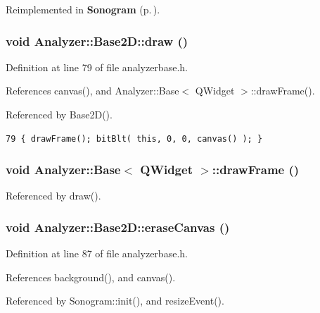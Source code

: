 Reimplemented in {\bf Sonogram} {\rm (p.\,\pageref{classSonogram_Sonograma5})}.
\subsubsection{\setlength{\rightskip}{0pt plus 5cm}void Analyzer::Base2D::draw ()\hspace{0.3cm}{\tt  [inline, private, slot]}}\label{classAnalyzer_1_1Base2D_Analyzer_1_1Base2Dk0}




Definition at line 79 of file analyzerbase.h.

References canvas(), and Analyzer::Base$<$ QWidget $>$::draw\-Frame().

Referenced by Base2D().



\footnotesize\begin{verbatim}79 { drawFrame(); bitBlt( this, 0, 0, canvas() ); }
\end{verbatim}\normalsize 
{}
\subsubsection{\setlength{\rightskip}{0pt plus 5cm}void {\bf Analyzer::Base}$<$ {\bf QWidget}  $>$::draw\-Frame ()\hspace{0.3cm}{\tt  [protected, inherited]}}\label{classAnalyzer_1_1Base_Analyzer_1_1Baseb1}




Referenced by draw().
\subsubsection{\setlength{\rightskip}{0pt plus 5cm}void Analyzer::Base2D::erase\-Canvas ()\hspace{0.3cm}{\tt  [inline, protected]}}\label{classAnalyzer_1_1Base2D_Sonogramb1}




Definition at line 87 of file analyzerbase.h.

References background(), and canvas().

Referenced by Sonogram::init(), and resize\-Event().



